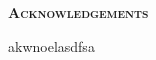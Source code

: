 \pagestyle{empty}%
\begin{center}
	\Huge \textsc{\textbf{Acknowledgements}}
	\hrulefill
\end{center}

akwnoelasdfsa
